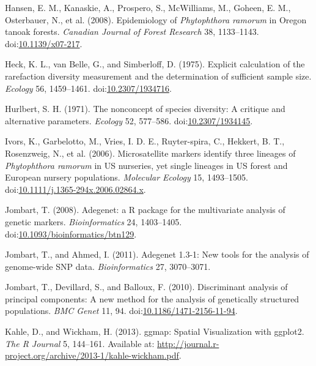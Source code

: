 \documentclass[double,12pt]{beavtex}
\begin{document}
  \hypertarget{ref-hansen2008epidemiology}{}
  Hansen, E. M., Kanaskie, A., Prospero, S., McWilliams, M., Goheen, E.
  M., Osterbauer, N., et al. (2008). Epidemiology of \emph{Phytophthora
  ramorum} in Oregon tanoak forests. \emph{Canadian Journal of Forest
  Research} 38, 1133--1143.
  doi:\href{https://doi.org/10.1139/x07-217}{10.1139/x07-217}.
  
  \hypertarget{ref-heck1975explicit}{}
  Heck, K. L., van Belle, G., and Simberloff, D. (1975). Explicit
  calculation of the rarefaction diversity measurement and the
  determination of sufficient sample size. \emph{Ecology} 56, 1459--1461.
  doi:\href{https://doi.org/10.2307/1934716}{10.2307/1934716}.
  
  \hypertarget{ref-hurlbert1971nonconcept}{}
  Hurlbert, S. H. (1971). The nonconcept of species diversity: A critique
  and alternative parameters. \emph{Ecology} 52, 577--586.
  doi:\href{https://doi.org/10.2307/1934145}{10.2307/1934145}.
  
  \hypertarget{ref-ivors2006microsatellite}{}
  Ivors, K., Garbelotto, M., Vries, I. D. E., Ruyter-spira, C., Hekkert,
  B. T., Rosenzweig, N., et al. (2006). Microsatellite markers identify
  three lineages of \emph{Phytophthora ramorum} in US nurseries, yet
  single lineages in US forest and European nursery populations.
  \emph{Molecular Ecology} 15, 1493--1505.
  doi:\href{https://doi.org/10.1111/j.1365-294x.2006.02864.x}{10.1111/j.1365-294x.2006.02864.x}.
  
  \hypertarget{ref-Jombartux5f2008}{}
  Jombart, T. (2008). Adegenet: a R package for the multivariate analysis
  of genetic markers. \emph{Bioinformatics} 24, 1403--1405.
  doi:\href{https://doi.org/10.1093/bioinformatics/btn129}{10.1093/bioinformatics/btn129}.
  
  \hypertarget{ref-jombart2011adegenet}{}
  Jombart, T., and Ahmed, I. (2011). Adegenet 1.3-1: New tools for the
  analysis of genome-wide SNP data. \emph{Bioinformatics} 27, 3070--3071.
  
  \hypertarget{ref-jombart2010discriminant}{}
  Jombart, T., Devillard, S., and Balloux, F. (2010). Discriminant
  analysis of principal components: A new method for the analysis of
  genetically structured populations. \emph{BMC Genet} 11, 94.
  doi:\href{https://doi.org/10.1186/1471-2156-11-94}{10.1186/1471-2156-11-94}.
  
  \hypertarget{ref-khale2013ggmap}{}
  Kahle, D., and Wickham, H. (2013). ggmap: Spatial Visualization with
  ggplot2. \emph{The R Journal} 5, 144--161. Available at:
  \url{http://journal.r-project.org/archive/2013-1/kahle-wickham.pdf}.
  
\end{document}
